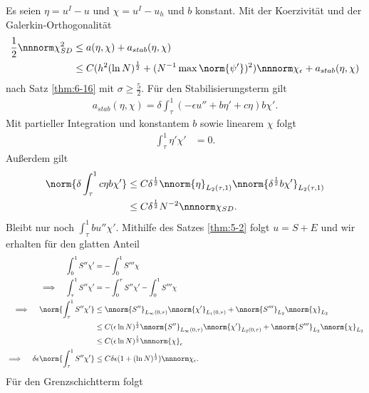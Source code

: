 \begin{beweis}
  Es seien $\eta = u^{I} - u$ und $\chi = u^{I} - u_{h}$ und $b$ konstant. Mit der Koerzivität und der Galerkin-Orthogonalität
  \begin{align*}
    \frac 12\nnnorm \chi_{SD}^{2} &\leq a (\eta, \chi) + a_{stab}(\eta, \chi)\\
    & \leq C (h^{2} (\ln N)^{\frac 12} + (N^{-1} \max \norm {\psi'})^{2})\nnnorm \chi_{\epsilon} + a_{stab}(\eta, \chi)
  \end{align*}
  nach Satz \ref{thm:6-16} mit $\sigma \geq \frac 52$. Für den Stabilisierungsterm gilt
  \begin{align*}
    a_{stab}(\eta, \chi) = \delta \int_{\tau}^{1}(-\epsilon u'' + b \eta' + c \eta)b \chi'. 
  \end{align*}
  Mit partieller Integration und konstantem $b$ sowie linearem $\chi$ folgt
  \begin{align*}
    \int_{\tau}^{1} \eta' \chi' &=0.  
  \end{align*}
  Außerdem gilt
  \begin{align*}
    \norm{\delta \int_{\tau}^{1} c \eta b \chi'} &\leq C \delta^{\frac 12} \nnorm{\eta}_{L_{2}(\tau, 1)} \nnorm{\delta^{\frac 12} b \chi'}_{L_{2}(\tau, 1)}\\
    & \leq C \delta^{ \frac 12} N^{-2} \nnnorm \chi_{SD}. 
  \end{align*}
  Bleibt nur noch $\int_{\tau}^{1} b u'' \chi'$. Mithilfe des Satzes \ref{thm:5-2} folgt $u = S + E$ und wir erhalten für den glatten Anteil
  \begin{align*}
    \int_{0}^{1} S'' \chi' &= - \int_{0}^{1} S''' \chi \\
    \implies \quad \int_{\tau}^{1} S'' \chi' &= - \int_{0}^{\tau} S'' \chi' - \int_{0}^{1} S'''\chi \\
    \implies \quad \norm{\int_{\tau}^{1} S'' \chi'} &\leq \nnorm{S''}_{L_{\infty}(0, \tau)} \nnorm{\chi'}_{L_{1}(0, \tau)} + \nnorm{S'''}_{L_{2}} \nnorm {\chi}_{L_{2}}\\
    &\leq C(\epsilon \ln N)^{\frac 12} \nnorm{S''}_{L_{\infty}(0, \tau)} \nnorm{\chi'}_{L_{2}(0, \tau)} + \nnorm{S'''}_{L_{2}} \nnorm {\chi}_{L_{2}}\\
    &\leq C(\epsilon \ln N)^{\frac 12} \nnnorm{\chi}_{\epsilon}\\
    \implies \quad  \delta\epsilon \norm{\int_{\tau}^{1} S'' \chi'} & \leq C \delta \epsilon(1 + (\ln N)^{\frac 12}) \nnnorm \chi_{\epsilon}. 
  \end{align*}
  Für den Grenzschichtterm folgt

\end{beweis}
